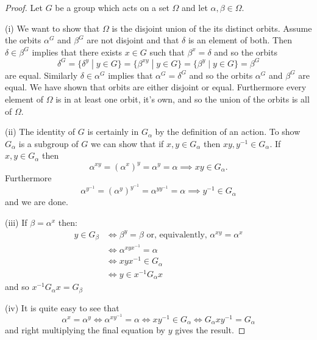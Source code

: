 \documentclass[]{article}
\theoremstyle{definition}
\begin{document}
\begin{proof} Let $G$ be a group which acts on a set $\Omega$ and let $\alpha, \beta \in \Omega$.

	(i) We want to show that $\Omega$ is the disjoint union of the its distinct orbits. Assume the orbits $\alpha^G$ and $\beta^G$ are not disjoint and that $\delta$ is an element of both. Then $\delta \in \beta^G$ implies that there exists $x \in G$ such that $\beta^x = \delta$ and so the orbits $$\delta^G = \{\delta^y \; | \; y \in G \} = \{\beta^{xy} \; | \; y \in G \} = \{\beta^y \; | \; y \in G \} = \beta^G$$ are equal. Similarly $\delta \in \alpha^G$ implies that $\alpha^G = \delta^G$ and so the orbits $\alpha^G$ and $\beta^G$ are equal. We have shown that orbits are either disjoint or equal. Furthermore every element of $\Omega$ is in at least one orbit, it's own, and so the union of the orbits is all of $\Omega$. 

(ii) The identity of $G$ is certainly in $G_\alpha$ by the definition of an action. To show $G_\alpha$ is a subgroup of $G$ we can show that if $x,y \in G_\alpha$ then $xy, y^{-1} \in G_\alpha$. If $x,y \in G_\alpha$ then $$\alpha^{xy} = (\alpha^x)^y = \alpha^y = \alpha \implies xy \in G_\alpha.$$
Furthermore $$\alpha^{y^{-1}} = (\alpha^y)^{y^{-1}} = \alpha^{yy^{-1}} = \alpha \implies y^{-1} \in G_\alpha$$
and we are done.

(iii) If $\beta = \alpha^x$ then:
\begin{align*}
	y \in G_\beta & \iff \beta^y = \beta \mbox{ or, equivalently, } \alpha^{xy}=\alpha^{x} \\
    & \iff \alpha^{xyx^{-1}} = \alpha \\
    & \iff xyx^{-1} \in G_\alpha \\
    & \iff y \in x^{-1}G_\alpha x
\end{align*}    
and so $x^{-1} G_\alpha x = G_\beta$

(iv) It is quite easy to see that
    $$ \alpha^x = \alpha^y \iff \alpha^{xy^{-1}} = \alpha \iff xy^{-1} \in G_\alpha \iff G_\alpha xy^{-1} = G_\alpha $$
    and right multiplying the final equation by $y$ gives the result.


\end{proof}
\end{document}
